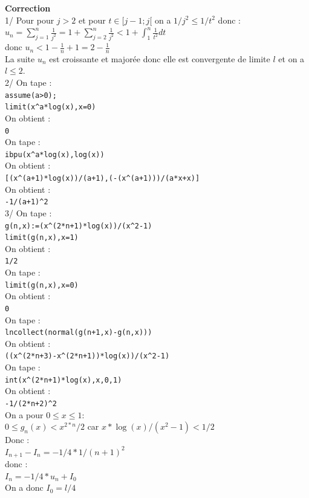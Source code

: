 \documentclass[a4paper,11pt]{book}
\begin{document}
{\bf Correction}\\
1/ Pour pour $j>2$ et pour $t \in [j-1;j[$ on a $1/j^2 \leq 1/t^2$ donc :\\
$\displaystyle u_n=\sum_{j=1}^n \frac{1}{j^2}=1+\sum_{j=2}^n \frac{1}{j^2}<1+\int_1^n \frac{1}{t^2}dt$\\
donc $u_n<1-\frac{1}{n}+1=2-\frac{1}{n}$\\
La suite $u_n$ est croissante et major\'ee donc elle est convergente de limite 
$l$ et on a $l \leq 2$.\\
2/ On tape :\\
{\tt assume(a>0);}\\
{\tt limit(x\verb|^|a*log(x),x=0)}\\
On obtient :\\
{\tt 0}\\
On tape :\\
{\tt ibpu(x\verb|^|a*log(x),log(x))}\\
On obtient :\\
{\tt [(x\verb|^|(a+1)*log(x))/(a+1),(-(x\verb|^|(a+1)))/(a*x+x)]}\\
On obtient :\\
{\tt -1/(a+1)\verb|^|2}\\
3/ On tape :\\
{\tt g(n,x):=(x\verb|^|(2*n+1)*log(x))/(x\verb|^|2-1)}\\
{\tt limit(g(n,x),x=1)}\\
On obtient :\\
{\tt 1/2}\\
On tape :\\
{\tt limit(g(n,x),x=0)}\\
On obtient :\\
{\tt 0}\\
On tape :\\
{\tt lncollect(normal(g(n+1,x)-g(n,x)))}\\
On obtient :\\
{\tt ((x\verb|^|(2*n+3)-x\verb|^|(2*n+1))*log(x))/(x\verb|^|2-1)}\\
On tape :\\
{\tt int(x\verb|^|(2*n+1)*log(x),x,0,1)}\\
On obtient :\\
{\tt -1/(2*n+2)\verb|^|2}\\
On a pour $0\leq x \leq 1$:\\
$0\leq g_n(x)<x^{2*n}/2$ car $x*\log(x)/(x^2-1)<1/2$\\
Donc :\\
$I_{n+1}-I_n=-1/4*1/(n+1)^2$\\
donc :\\
$I_n=-1/4*u_n+I_0$\\
On a donc $I_0=l/4$
\end{document}
